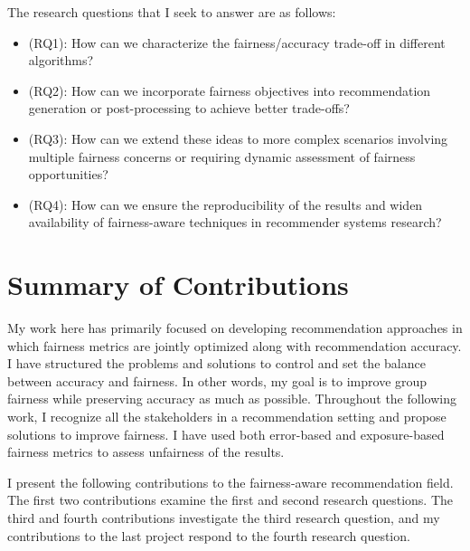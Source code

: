 The research questions that I seek to answer are as follows:
\begin{itemize}
    \item (RQ1): How can we characterize the fairness/accuracy trade-off in different algorithms?
    \item (RQ2): How can we incorporate fairness objectives into recommendation generation or post-processing to achieve better trade-offs? %
    \item (RQ3): How can we extend these ideas to more complex scenarios involving multiple fairness concerns or requiring dynamic assessment of fairness opportunities? %
    \item (RQ4): How can we ensure the reproducibility of the results and widen availability of fairness-aware techniques in recommender systems research? %
\end{itemize}


\section{Summary of Contributions}

My work here has primarily focused on developing recommendation approaches in which fairness metrics are jointly optimized along with recommendation accuracy. I have structured the problems and solutions to control and set the balance between accuracy and fairness. In other words, my goal is to improve group fairness while preserving accuracy as much as possible. Throughout the following work, I recognize all the stakeholders in a recommendation setting and propose solutions to improve fairness. I have used both error-based and exposure-based fairness metrics to assess unfairness of the results. 

I present the following contributions to the fairness-aware recommendation field. The first two contributions examine the first and second research questions. The third and fourth contributions investigate the third research question, and my contributions to the last project respond to the fourth research question.

